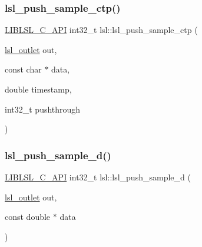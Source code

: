 \mbox{\label{namespacelsl_a7127acf0d2106d5ae673489510845f58}} 
\subsubsection{\texorpdfstring{lsl\+\_\+push\+\_\+sample\+\_\+ctp()}{lsl\_push\_sample\_ctp()}}
{\footnotesize\ttfamily \hyperlink{lsl__cpp_8h_aafd0ef1813e8be84a1420c4f1df64615}{L\+I\+B\+L\+S\+L\+\_\+\+C\+\_\+\+A\+PI} int32\+\_\+t lsl\+::lsl\+\_\+push\+\_\+sample\+\_\+ctp (\begin{DoxyParamCaption}\item[{\hyperlink{namespacelsl_abcf512b0f66dacf86c10b165995fd50b}{lsl\+\_\+outlet}}]{out,  }\item[{const char $\ast$}]{data,  }\item[{double}]{timestamp,  }\item[{int32\+\_\+t}]{pushthrough }\end{DoxyParamCaption})}

\mbox{\label{namespacelsl_ac7d63bbdbdd3b0ec26d49b22b5858d8e}} 
\subsubsection{\texorpdfstring{lsl\+\_\+push\+\_\+sample\+\_\+d()}{lsl\_push\_sample\_d()}}
{\footnotesize\ttfamily \hyperlink{lsl__cpp_8h_aafd0ef1813e8be84a1420c4f1df64615}{L\+I\+B\+L\+S\+L\+\_\+\+C\+\_\+\+A\+PI} int32\+\_\+t lsl\+::lsl\+\_\+push\+\_\+sample\+\_\+d (\begin{DoxyParamCaption}\item[{\hyperlink{namespacelsl_abcf512b0f66dacf86c10b165995fd50b}{lsl\+\_\+outlet}}]{out,  }\item[{const double $\ast$}]{data }\end{DoxyParamCaption})}

\mbox{\label{namespacelsl_a6877d8a4ebbe802a123a09505a106f3f}} 

